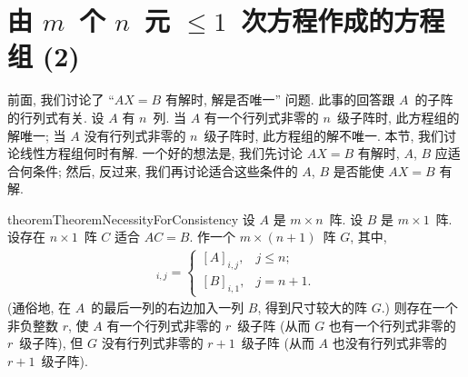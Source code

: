 \documentclass[../libro.tex]{subfiles}
\begin{document}
\KunAsteriskoEnEnhavtabelo
\section{\texorpdfstring{由 \(m\)~个 \(n\)~元
    \({\leq} 1\)~次方程作成的方程组 (2)}%
{由 m 个 n 元 ≤1 次方程作成的方程组 (2)}}
\SenAsteriskoEnEnhavtabelo

\maldevigalegajxo

前面, 我们讨论了
``\(AX = B\) 有解时, 解是否唯一''
问题.
此事的回答跟 \(A\)~的子阵的行列式有关.
设 \(A\) 有 \(n\)~列.
当 \(A\) 有一个行列式非零的 \(n\)~级子阵时,
此方程组的解唯一;
当 \(A\) 没有行列式非零的 \(n\)~级子阵时,
此方程组的解不唯一.
本节, 我们讨论线性方程组何时有解.
一个好的想法是,
我们先讨论 \(AX = B\) 有解时,
\(A\), \(B\) 应适合何条件;
然后, 反过来,
我们再讨论适合这些条件的 \(A\), \(B\)
是否能使 \(AX = B\) 有解.

\begin{restatable}{theorem}{TheoremNecessityForConsistency}
    设 \(A\) 是 \(m \times n\)~阵.
    设 \(B\) 是 \(m \times 1\)~阵.
    设存在 \(n \times 1\)~阵 \(C\)
    适合 \(AC = B\).
    作一个 \(m \times (n+1)\)~阵 \(G\),
    其中,
    \begin{align*}
        [G]_{i,j} =
        \begin{cases}
            [A]_{i,j}, & j \leq n;  \\
            [B]_{i,1}, & j = n + 1.
        \end{cases}
    \end{align*}
    (通俗地, 在 \(A\)~的最后一列的右边加入一列 \(B\),
    得到尺寸较大的阵 \(G\).)
    则存在一个非负整数 \(r\), 使
    \(A\) 有一个行列式非零的 \(r\)~级子阵
    (从而 \(G\) 也有一个行列式非零的 \(r\)~级子阵),
    但 \(G\) 没有行列式非零的 \(r+1\)~级子阵
    (从而 \(A\) 也没有行列式非零的 \(r+1\)~级子阵).
\end{restatable}
\end{document}

